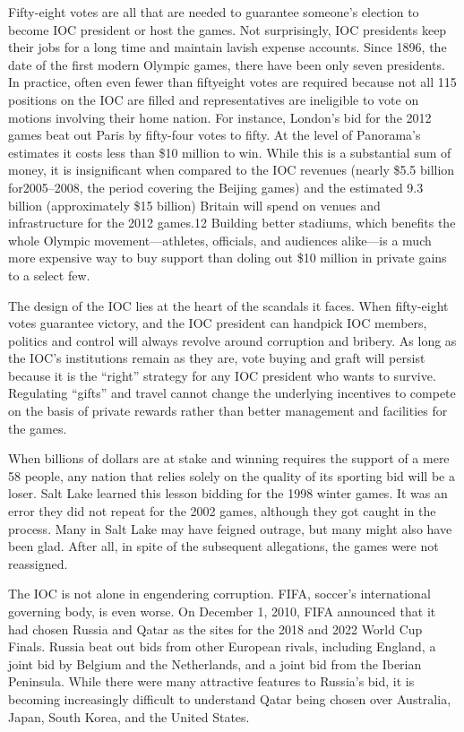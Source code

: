 \documentclass[10pt]{article}
\begin{document}
{\large Fifty-eight votes are all that are needed to guarantee someone's
election to become IOC president or host the games. Not surprisingly, IOC
presidents keep their jobs for a long time and maintain lavish expense accounts.
Since 1896, the date of the first modern Olympic games, there have been only
seven presidents. In practice, often even fewer than fiftyeight votes are
required because not all 115 positions on the IOC are filled and representatives
are ineligible to vote on motions involving their home nation. For instance,
London's bid for the 2012 games beat out Paris by fifty-four votes to fifty. At
the level of Panorama's estimates it costs less than \$10 million to win. While
this is a substantial sum of money, it is insignificant when compared to the IOC
revenues (nearly \$5.5 billion for2005--2008, the period covering the Beijing
games) and the estimated 9.3 billion (approximately \$15 billion) Britain will
spend on venues and infrastructure for the 2012 games.12 Building better
stadiums, which benefits the whole Olympic movement---athletes, officials, and
audiences alike---is a much more expensive way to buy support than doling out
\$10 million in private gains to a select few.}

{\large The design of the IOC lies at the heart of the scandals it faces. When
fifty-eight votes guarantee victory, and the IOC president can handpick IOC
members, politics and control will always revolve around corruption and bribery.
As long as the IOC's institutions remain as they are, vote buying and graft will
persist because it is the ``right'' strategy for any IOC president who wants to
survive. Regulating ``gifts'' and travel cannot change the underlying incentives
to compete on the basis of private rewards rather than better management and
facilities for the games.}

{\large When billions of dollars are at stake and winning requires the support
of a mere 58 people, any nation that relies solely on the quality of its sporting
bid will be a loser. Salt Lake learned this lesson bidding for the 1998 winter
games. It was an error they did not repeat for the 2002 games, although they got
caught in the process. Many in Salt Lake may have feigned outrage, but many might
also have been glad. After all, in spite of the subsequent allegations, the games
were not reassigned.}

{\large The IOC is not alone in engendering corruption. FIFA, soccer's
international governing body, is even worse. On December 1, 2010, FIFA announced
that it had chosen Russia and Qatar as the sites for the 2018 and 2022 World Cup
Finals. Russia beat out bids from other European rivals, including England, a
joint bid by Belgium and the Netherlands, and a joint bid from the Iberian
Peninsula. While there were many attractive features to Russia's bid, it is
becoming increasingly difficult to understand Qatar being chosen over Australia,
Japan, South Korea, and the United States.}
\end{document}
